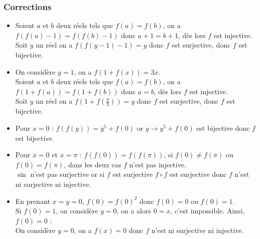 \subsubsection{Corrections}
\begin{sol}[][1]
\begin{itemize}
    \item Soient $a$ et $b$ deux réels tels que $f(a)=f(b)$, on a $f(f(a)-1)=f(f(b)-1)$ donc $a+1=b+1$, dès lors $f$ est injective.\\
    Soit $y$ un réel on a $f(f(y-1)-1)=y$ donc $f$ est surjective, donc $f$ est bijective.
    \item On considère $y=1$, on a $f(1+f(x))=3x$.\\
    Soient $a$ et $b$ deux réels tels que $f(a)=f(b)$, on a $f(1+f(a))=f(1+f(b))$ donc $a=b$, dès lors $f$ est injective.\\
    Soit $y$ un réel on a $f(1+f(\frac y3))=y$ donc $f$ est surjective, donc $f$ est bijective.
    \item Pour $x=0$ : $f(f(y))=y^5+f(0)$ or $y\to y^5+f(0)$ est bijective donc $f$ est bijective.
    \item Pour $x=0$ et $x=\pi$ : $f(f(0))=f(f(\pi))$, si $f(0)\ne f(\pi)$ ou $f(0)=f(\pi)$, dans les deux cas $f$ n'est pas injective.\\
    $\sin$ n'est pas surjective or si $f$ est surjective $f\circ f$ est surjective donc $f$ n'est ni surjective ni injective.
    \item En prenant $x=y=0$, $f(0)=f(0)^2$ donc $f(0)=0$ ou $f(0)=1$.\\
    Si $f(0)=1$, on considère $y=0$, on a alors $0=x$, c'est impossible. Ainsi, $f(0)=0$ :\\
    On considère $y=0$, on a $f(x)=0$ donc $f$ n'est ni surjective ni injective.
\end{itemize}
\end{sol}

